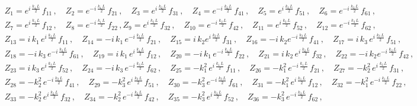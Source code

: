 \documentclass[aps,prb,onecolumn,longbibliography,nofootinbib,citeautoscript,10pt]{revtex4-2}
\def \nn{\nonumber \\}
\def\nn{\nonumber \\}
\def \nn{\nonumber \\}
\begin{document}
\begin{align}
& Z_1  = e^{ i \, \frac{ k_1 \, L} {2}} \, f_{11} \,,  \quad 
Z_2 = e^{- i \, \frac{ k_1 \, L} {2}} \, f_{21} \,,  
\quad Z_3  = e^{ i \, \frac{ k_2 \, L} {2}} \, f_{31} \,, \quad 
Z_4  = e^{- i \, \frac{ k_2 \, L} {2}} \, f_{41} \,,  
\quad Z_5  = e^{ i \, \frac{ k_3 \, L} {2}} \, f_{51} \,,  \quad
 Z_6 = e^{- i \, \frac{ k_3 \, L} {2}} \, f_{61} \,, \nn &
Z_7  = e^{ i \, \frac{ k_1 \, L} {2}} \, f_{12} \,,  \quad 
Z_8  = e^{- i \, \frac{ k_1 \, L} {2}} \, f_{22} \,,  
 Z_9  = e^{ i \, \frac{ k_2 \, L} {2}} \, f_{32} \,,  
\quad Z_{10}  = e^{- i \, \frac{ k_2 \, L} {2}} \, f_{42} \,, \quad
 Z_{11}  = e^{ i \, \frac{ k_3 \, L} {2}} \, f_{52} \,,  
 \quad Z_{12}  = e^{- i \, \frac{ k_3 \, L} {2}} \, f_{62} \,, \nn &
Z_{13}  =  i \, k_1 \, e^{ i \, \frac{ k_1 \, L} {2}} \, f_{11} \,,  \quad
Z_{14}  = - i \, k_1 \, e^{- i \, \frac{ k_1 \, L} {2}} \, f_{21} \,,  \quad
 Z_{15}  =  i \, k_2e^{ i \, \frac{ k_2 \, L} {2}} \, f_{31} \,,   \quad
 Z_{16}  = - i \, k_2e^{- i \, \frac{ k_2 \, L} {2}} \, f_{41} \,,  \quad
  Z_{17}  =  i \, k_3 \, e^{ i \, \frac{ k_3 \, L} {2}} \, f_{51} \,,  \nn  &
  Z_{18}  = - i \, k_3 \, e^{- i \, \frac{ k_3 \, L} {2}} \, f_{61} \,, \quad
Z_{19}  =  i \, k_1 \, e^{ i \, \frac{ k_1 \, L} {2}} \, f_{12} \,,  
\quad Z_{20}  = - i \, k_1 \, e^{- i \, \frac{ k_1 \, L} {2}} \, f_{22} \,,  \quad
 Z_{21} =  i \, k_2 \,e^{ i \, \frac{ k_2 \, L} {2}} \, f_{32} \,,  
 \quad Z_{22} = - i \, k_2e^{- i \, \frac{ k_2 \, L} {2}} \, f_{42} \,, \nn &  
 Z_{23}  =  i \, k_3 \, e^{ i \, \frac{ k_3 \, L} {2}} \, f_{52} \,, \quad
Z_{24} = - i \, k_3 \, e^{- i \, \frac{ k_3 \, L} {2}} \, f_{62} \,, \quad
Z_{25} = -k_1^2\, e^{ i \, \frac{ k_1 \, L} {2}} \, f_{11} \,,  \quad
Z_{26}  = -k_1^2\, e^{- i \, \frac{ k_1 \, L} {2}} \, f_{21} \,,  
\quad Z_{27}  = -k_2^2\, e^{ i \, \frac{ k_2 \, L} {2}} \, f_{31} \,,  
\nn &  Z_{28} = -k_2^2\, e^{- i \, \frac{ k_2 \, L} {2}} \, f_{41} \,,  
\quad Z_{29}  = -k_3^2\, e^{ i \, \frac{ k_3 \, L} {2}} \, f_{51} \,,  \quad
 Z_{30}  = -k_3^2\, e^{- i \, \frac{ k_3 \, L} {2}} \, f_{61} \,, \quad
Z_{31}  = -k_1^2\, e^{ i \, \frac{ k_1 \, L} {2}} \, f_{12} \,,  \quad
 Z_{32}  = -k_1^2\, e^{- i \, \frac{ k_1 \, L} {2}} \, f_{22} \,,  
\nn &  Z_{33} = -k_2^2\, e^{ i \, \frac{ k_2 \, L} {2}} \, f_{32} \,, \quad
  Z_{34}  = -k_2^2\, e^{- i \, \frac{ k_2 \, L} {2}} \, f_{42} \,, 
  \quad Z_{35}  = -k_3^2\, e^{ i \, \frac{ k_3 \, L} {2}} \, f_{52} \,,  \quad
 Z_{36} = -k_3^2\, e^{- i \, \frac{ k_3 \, L} {2}} \, f_{62}\,,
\end{align}
\end{document}
